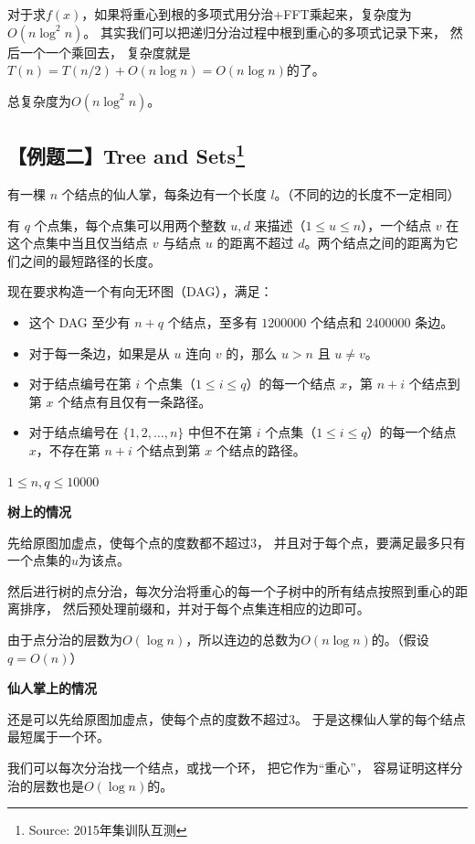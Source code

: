 \documentclass{noithesis}
\begin{document}
对于求$f(x)$，如果将重心到根的多项式用分治+FFT乘起来，复杂度为$O(n \log ^ 2 n)$。
其实我们可以把递归分治过程中根到重心的多项式记录下来，
然后一个一个乘回去，
复杂度就是$T(n) = T(n/2) + O(n \log n) = O(n \log n)$的了。

总复杂度为$O(n \log ^ 2 n)$。


\subsection{【例题二】Tree and Sets\protect\footnote{Source: 2015年集训队互测}}
有一棵 $n$ 个结点的仙人掌，每条边有一个长度 $l$。（不同的边的长度不一定相同）

有 $q$ 个点集，每个点集可以用两个整数 $u, d$ 来描述（$1 \leq u \leq n$），一个结点 $v$ 在这个点集中当且仅当结点 $v$ 与结点 $u$ 的距离不超过 $d$。两个结点之间的距离为它们之间的最短路径的长度。

现在要求构造一个有向无环图（DAG），满足：
\begin{itemize}
\setlength{\parskip}{-7pt}
\item 这个 DAG 至少有 $n+q$ 个结点，至多有 $1200000$ 个结点和 $2400000$ 条边。
\item 对于每一条边，如果是从 $u$ 连向 $v$ 的，那么 $u > n$ 且 $u \neq v$。
\item 对于结点编号在第 $i$ 个点集（$1 \leq i \leq q$）的每一个结点 $x$，第 $n+i$ 个结点到第 $x$ 个结点有且仅有一条路径。
\item 对于结点编号在 $\{ 1, 2, \dots, n\}$ 中但不在第 $i$ 个点集（$1 \leq i \leq q$）的每一个结点 $x$，不存在第 $n+i$ 个结点到第 $x$ 个结点的路径。
\end{itemize}

$1 \le n, q \le 10000$

\text{}

\textbf{树上的情况}

先给原图加虚点，使每个点的度数都不超过3，
并且对于每个点，要满足最多只有一个点集的$u$为该点。

然后进行树的点分治，每次分治将重心的每一个子树中的所有结点按照到重心的距离排序，
然后预处理前缀和，并对于每个点集连相应的边即可。

由于点分治的层数为$O(\log n)$，所以连边的总数为$O(n \log n)$的。（假设$q = O(n)$）

\text{}

\textbf{仙人掌上的情况}

还是可以先给原图加虚点，使每个点的度数不超过3。
于是这棵仙人掌的每个结点最短属于一个环。

我们可以每次分治找一个结点，或找一个环，
把它作为``重心''，
容易证明这样分治的层数也是$O(\log n)$的。
\end{document}
